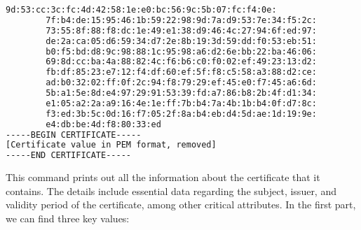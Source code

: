 \documentclass{article}
\begin{document}
\begin{lstlisting}[language=bash]
        9d:53:cc:3c:fc:4d:42:58:1e:e0:bc:56:9c:5b:07:fc:f4:0e:
        7f:b4:de:15:95:46:1b:59:22:98:9d:7a:d9:53:7e:34:f5:2c:
        73:55:8f:88:f8:dc:1e:49:e1:38:d9:46:4c:27:94:6f:ed:97:
        de:2a:ca:05:d6:59:34:d7:2e:8b:19:3d:59:dd:f0:53:eb:51:
        b0:f5:bd:d8:9c:98:88:1c:95:98:a6:d2:6e:bb:22:ba:46:06:
        69:8d:cc:ba:4a:88:82:4c:f6:b6:c0:f0:02:ef:49:23:13:d2:
        fb:df:85:23:e7:12:f4:df:60:ef:5f:f8:c5:58:a3:88:d2:ce:
        ad:b0:32:02:ff:0f:2c:94:f8:79:29:ef:45:e0:f7:45:a6:6d:
        5b:a1:5e:8d:e4:97:29:91:53:39:fd:a7:86:b8:2b:4f:d1:34:
        e1:05:a2:2a:a9:16:4e:1e:ff:7b:b4:7a:4b:1b:b4:0f:d7:8c:
        f3:ed:3b:5c:0d:16:f7:05:2f:8a:b4:eb:d4:5d:ae:1d:19:9e:
        e4:db:be:4d:f8:80:33:ed
-----BEGIN CERTIFICATE-----
[Certificate value in PEM format, removed]
-----END CERTIFICATE-----
\end{lstlisting}
This command prints out all the information about the certificate that it contains. The details include essential data regarding the subject, issuer, and validity period of the certificate, among other critical attributes. In the first part, we can find three key values:
\end{document}
